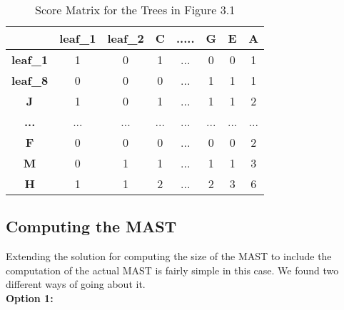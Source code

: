 \begin{table}[]
	\centering
	\begin{tabular}{|c|c|c|c|c|c|c|c|}
		\hline
		\textbf{}        & \textbf{leaf\_1} & \textbf{leaf\_2} & \textbf{C} & \textbf{.....} & \textbf{G} & \textbf{E} & \textbf{A} \\ \hline
		\textbf{leaf\_1} & 1                & 0                & 1          & ...            & 0          & 0          & 1          \\ \hline
		\textbf{leaf\_8} & 0                & 0                & 0          & ...            & 1          & 1          & 1          \\ \hline
		\textbf{J}       & 1                & 0                & 1          & ...            & 1          & 1          & 2          \\ \hline
		\textbf{...}     & ...              & ...              & ...        & ...            & ...        & ...        & ...        \\ \hline
		\textbf{F}       & 0                & 0                & 0          & ...            & 0          & 0          & 2          \\ \hline
		\textbf{M}       & 0                & 1                & 1          & ...            & 1          & 1          & 3          \\ \hline
		\textbf{H}       & 1                & 1                & 2          & ...            & 2          & 3          & 6          \\ \hline
	\end{tabular}
	
	\label{Table:Table1}
	\caption{Score Matrix for the Trees in Figure 3.1}
\end{table}




\subsection{Computing the MAST}
Extending the solution for computing the size of the MAST to include the computation of the actual MAST is fairly simple in this case. We found two different ways of going about it. 
\\
\textbf{Option 1:}



